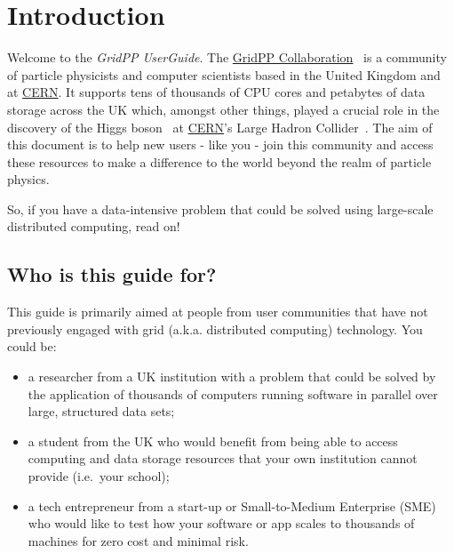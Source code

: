 \section{Introduction}
\label{sec:intro}

Welcome to the \emph{GridPP UserGuide}. The
\href{https://www.gridpp.ac.uk}{GridPP Collaboration}~\cite{gridpp2006,gridpp2009}
is a community of
particle physicists and computer scientists based in the United Kingdom
and at \href{http://cern.ch}{CERN}. It supports tens of thousands of CPU
cores and petabytes of data storage across the UK which, amongst other
things, played a crucial role in the discovery of the
Higgs boson~\cite{CMS2012a,ATLAS2012c}
at
\href{http://cern.ch}{CERN}'s Large Hadron Collider~\cite{LHC2008}.
The aim of this
document is to help new users - like you - join this community and
access these resources to make a difference to the world beyond the
realm of particle physics.

So, if you have a data-intensive problem that could be solved using
large-scale distributed computing, read on!

\subsection{Who is this guide for?}
\label{who-is-this-guide-for}
This guide is primarily aimed at people from user communities that have
not previously engaged with grid (a.k.a. distributed computing)
technology. You could be:

\begin{itemize}
\tightlist
\item
  a researcher from a UK institution with a problem that could be solved
  by the application of thousands of computers running software in
  parallel over large, structured data sets;
\item
  a student from the UK who would benefit from being able to access
  computing and data storage resources that your own institution cannot
  provide (i.e.~your school);
\item
  a tech entrepreneur from a start-up or Small-to-Medium Enterprise
  (SME) who would like to test how your software or app scales to
  thousands of machines for zero cost and minimal risk.
\end{itemize}


